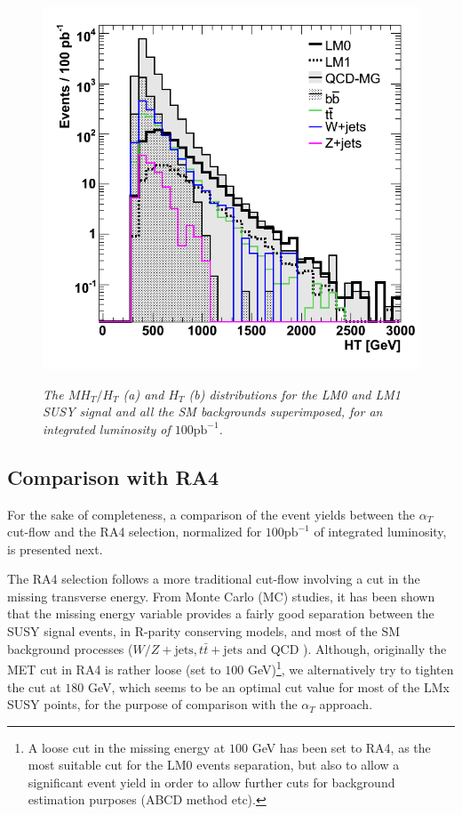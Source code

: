\begin{figure}[h!]
\begin{minipage}[b]{0.5\linewidth}
{\label{fig:ht}\includegraphics[scale=0.38]{./plots/HT-AllSignals.png}} 
\end{minipage}
\caption{\textit{The $MH_{T}/H_{T}$ (a) and $H_{T}$ (b) distributions for the LM0 and LM1 SUSY signal and all the SM backgrounds superimposed, for an integrated luminosity of $100 \textrm{pb}^{-1}$.} }
\vspace{5mm}
\label{fig:dists2}
\end{figure}


\subsection{Comparison with RA4}

For the sake of completeness, a comparison of the event yields between the $\alpha_{T}$ cut-flow and the RA4 selection, normalized for $100 \textrm{pb}^{-1}$ of integrated luminosity, is presented next.

The RA4 selection follows a more traditional cut-flow involving a cut in the missing transverse energy. From Monte Carlo (MC) studies, it has been shown that the missing energy variable provides a fairly good separation between the SUSY signal events, in R-parity conserving models, and most of the SM background processes ($W/Z + \textrm{jets}, t\bar{t} + \textrm{jets}$ and QCD ). Although, originally the MET cut in RA4 is rather loose (set to $100$ GeV)\footnote{A loose cut in the missing energy at $100$ GeV has been set to RA4, as the most suitable cut for the LM0 events separation, but also to allow a significant event yield in order to allow further cuts for background estimation purposes (ABCD method etc).}, we alternatively try to tighten the cut at $180$ GeV, which seems to be an optimal cut value for most of the LMx SUSY points, for the purpose of comparison with the $\alpha_{T}$ approach.

